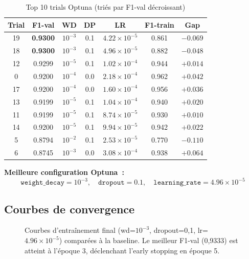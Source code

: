\documentclass[12pt,a4paper]{article}
\newcommand{\best}[1]{\textcolor{bestgreen}{\textbf{#1}}}
\begin{document}
\begin{table}[H]
  \centering
  \caption{Top 10 trials Optuna (triés par F1-val décroissant)}
  \label{tab:optuna_top10}
  \begin{tabular}{ccccccc}
    \toprule
    \textbf{Trial} & \textbf{F1-val} & \textbf{WD} & \textbf{DP}
    & \textbf{LR} & \textbf{F1-train} & \textbf{Gap} \\
    \midrule
    \rowcolor{bestgreen!15}
    19 & \best{0.9300} & $10^{-3}$ & 0.1 & $4.22 \times 10^{-5}$ & 0.861 & $-0.069$ \\
    \rowcolor{bestgreen!15}
    18 & \best{0.9300} & $10^{-3}$ & 0.1 & $4.96 \times 10^{-5}$ & 0.882 & $-0.048$ \\
    12 & 0.9299        & $10^{-5}$ & 0.1 & $1.02 \times 10^{-4}$ & 0.944 & $+0.014$ \\
    0  & 0.9200        & $10^{-4}$ & 0.0 & $2.18 \times 10^{-4}$ & 0.962 & $+0.042$ \\
    17 & 0.9200        & $10^{-4}$ & 0.0 & $1.60 \times 10^{-4}$ & 0.956 & $+0.036$ \\
    13 & 0.9199        & $10^{-5}$ & 0.1 & $1.04 \times 10^{-4}$ & 0.940 & $+0.020$ \\
    11 & 0.9199        & $10^{-5}$ & 0.1 & $8.74 \times 10^{-5}$ & 0.930 & $+0.010$ \\
    14 & 0.9200        & $10^{-5}$ & 0.1 & $9.94 \times 10^{-5}$ & 0.942 & $+0.022$ \\
    5  & 0.8794        & $10^{-2}$ & 0.1 & $2.53 \times 10^{-5}$ & 0.770 & $-0.110$ \\
    6  & 0.8745        & $10^{-3}$ & 0.0 & $3.08 \times 10^{-4}$ & 0.938 & $+0.064$ \\
    \bottomrule
  \end{tabular}
\end{table}

\textbf{Meilleure configuration Optuna~:}
\begin{equation}
  \label{eq:best_params}
  \boxed{\texttt{weight\_decay} = 10^{-3}, \quad
         \texttt{dropout} = 0.1, \quad
         \texttt{learning\_rate} = 4.96 \times 10^{-5}}
\end{equation}

\subsection{Courbes de convergence}
\label{ssec:convergence}

\begin{figure}[H]
  \centering
  \caption{Courbes d'entraînement final (wd=$10^{-3}$, dropout=0,1,
    lr=$4.96\times10^{-5}$) comparées à la baseline. Le meilleur F1-val (0,9333)
    est atteint à l'époque 3, déclenchant l'early stopping en époque 5.}
  \label{fig:final_curves}
\end{figure}
\end{document}
